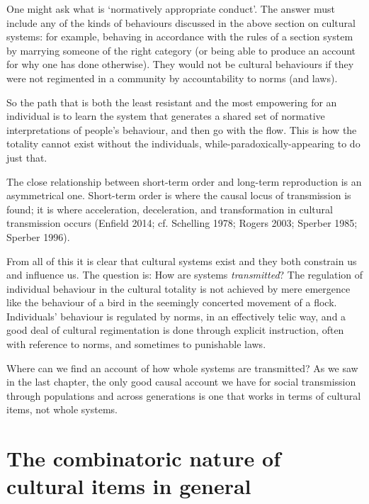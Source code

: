 One might ask what is \textquoteleft normatively appropriate conduct'. The answer must 
include any of the kinds of behaviours discussed in the above section on 
cultural systems: for example, behaving in accordance with the rules of 
a section system by marrying someone of the right category (or being 
able to produce an account for why one has done otherwise). They would 
not be cultural behaviours if they were not regimented in a community by 
accountability to norms (and laws). 



So the path that is both the least resistant and the most empowering for 
an individual is to learn the system that generates a shared set of 
normative interpretations of people's behaviour, and then go with the 
flow. This is how the totality cannot exist without the individuals, 
while-paradoxically-appearing to do just that. 



The close relationship between short-term order and long-term 
reproduction is an asymmetrical one. Short-term order is where the 
causal locus of transmission is found; it is where acceleration, 
deceleration, and transformation in cultural transmission occurs 
(Enfield 2014; cf. Schelling 1978; Rogers 2003; Sperber 1985; Sperber 
1996). 



From all of this it is clear that cultural systems exist and they both 
constrain us and influence us. The question is: How are systems \textit{
transmitted}? The regulation of individual behaviour in the cultural 
totality is not achieved by mere emergence like the behaviour of a bird 
in the seemingly concerted movement of a flock. Individuals' behaviour 
is regulated by norms, in an effectively telic way, and a good deal of 
cultural regimentation is done through explicit instruction, often with 
reference to norms, and sometimes to punishable laws. 



Where can we find an account of how whole systems are transmitted? As we 
saw in the last chapter, the only good causal account we have for social 
transmission through populations and across generations is one that 
works in terms of cultural items, not whole systems.



\section{The combinatoric nature of cultural items in general}



